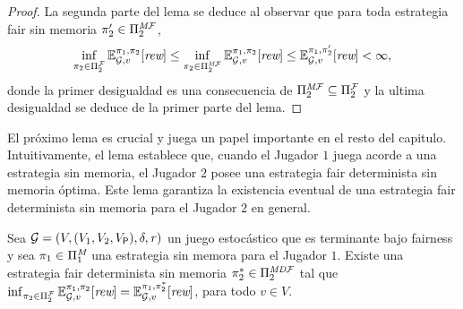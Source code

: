 \begin{proof}
  
  La segunda parte del lema se deduce al observar que para toda estrategia fair sin memoria $\pi_{2}' \in \Pi^{\textit{M}\mathcal{F}}_{2}$,
  \[\inf_{\pi_{2} \in \Pi^{\mathcal{F}}_{2}} \mathbb{E}^{\pi_{1}, \pi_{2}}_{\mathcal{G},v}[\textit{rew}]
  \leq \inf_{\pi_{2} \in \Pi^{\textit{M}\mathcal{F}}_{2}} \mathbb{E}^{\pi_{1}, \pi_{2}}_{\mathcal{G},v}[\textit{rew}]
  \leq \mathbb{E}^{\pi_{1}, \pi_{2}'}_{\mathcal{G},v}[\textit{rew}] < \infty,\]
  donde la primer desigualdad es una consecuencia de
  $\Pi^{\textit{M}\mathcal{F}}_{2}\subseteq\Pi^{\mathcal{F}}_{2}$ y la ultima desigualdad
  se deduce de la primer parte del lema.  
  \qedhere
\end{proof}

El próximo lema es crucial y juega un papel importante en el resto del capitulo.  Intuitivamente, el lema establece que, cuando el Jugador $1$ juega acorde a una estrategia sin memoria, el Jugador $2$ posee una estrategia fair determinista sin memoria óptima.
%
Este lema garantiza la existencia eventual de una estrategia fair determinista sin memoria para el Jugador $2$ en general.
%
\begin{lemma}\label{lm:infima-in-dmf}%
  Sea $\mathcal{G}= (V, (V_1, V_2, V_{\mathsf{P}}), \delta, \mathit{r})$ un
  juego estocástico que es terminante bajo fairness y sea
  $\pi_{1} \in \Pi^{\textit{M}}_{1}$ una estrategia sin memora para el Jugador $1$.  Existe una estrategia fair determinista sin memoria
  $\pi^*_{2}\in\Pi^{\textit{MD}\mathcal{F}}_{2}$ tal que
  $\inf_{\pi_{2} \in \Pi^{\mathcal{F}}_{2}} \mathbb{E}^{\pi_{1}, \pi_{2}}_{\mathcal{G},v}[\textit{rew}]
   =
   \mathbb{E}^{\pi_{1}, \pi^*_{2}}_{\mathcal{G},v}[\textit{rew}]$, para todo $v \in V$.
\end{lemma}
%
\iffalse
